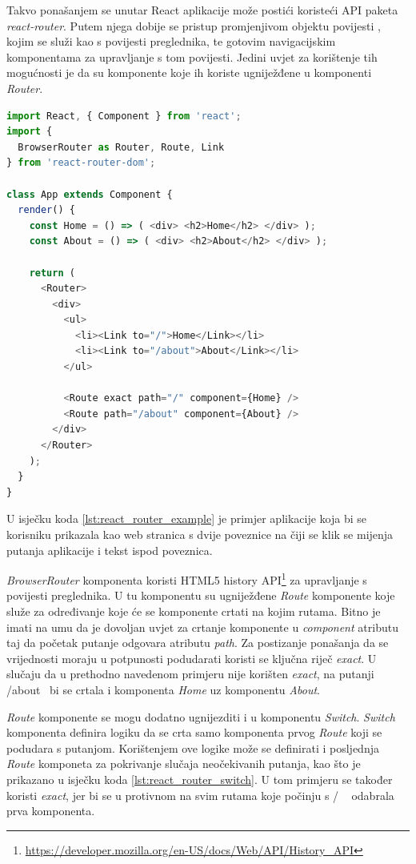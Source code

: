 \documentclass[times, utf8, zavrsni, numeric]{fer}
\newcommand{\razmakp}{\vspace{18pt}}
\newcommand{\razmaks}{\vspace{10pt}}
\begin{document}
Takvo ponašanjem se unutar React aplikacije može postići koristeći API paketa \emph{react-router}.
Putem njega dobije se pristup promjenjivom objektu povijesti , kojim se služi kao s povijesti preglednika, te gotovim navigacijskim komponentama za upravljanje s tom povijesti.
Jedini uvjet za korištenje tih mogućnosti je da su komponente koje ih koriste ugniježđene u komponenti \emph{Router}\citep{reactRouter}.

\razmakp
\begin{lstlisting}[language=JavaScript, caption={Primjer korištenja \emph{react-router}}, label={lst:react_router_example}]
import React, { Component } from 'react';
import { 
  BrowserRouter as Router, Route, Link
} from 'react-router-dom';

class App extends Component {
  render() {
    const Home = () => ( <div> <h2>Home</h2> </div> );
    const About = () => ( <div> <h2>About</h2> </div> );

    return (
      <Router>
        <div>
          <ul>
            <li><Link to="/">Home</Link></li>
            <li><Link to="/about">About</Link></li>
          </ul>

          <Route exact path="/" component={Home} />
          <Route path="/about" component={About} />
        </div>
      </Router>
    );
  }
}
\end{lstlisting}
\razmaks

U isječku koda \ref{lst:react_router_example} je primjer aplikacije koja bi se korisniku prikazala kao web stranica s dvije poveznice na čiji se klik se mijenja putanja aplikacije i tekst ispod poveznica.

\emph{BrowserRouter} komponenta koristi HTML5 history API\footnote{\url{https://developer.mozilla.org/en-US/docs/Web/API/History_API}} za upravljanje s povijesti preglednika.
U tu komponentu su ugniježđene \emph{Route} komponente koje služe za određivanje koje će se komponente crtati na kojim rutama.
Bitno je imati na umu da je dovoljan uvjet za crtanje komponente u \emph{component} atributu taj da početak putanje odgovara atributu \emph{path}.
Za postizanje ponašanja da se vrijednosti moraju u potpunosti podudarati koristi se ključna riječ \emph{exact}.
U slučaju da u prethodno navedenom primjeru nije korišten \emph{exact}, na putanji \glqq /about\grqq ~ bi se crtala i komponenta \emph{Home} uz komponentu \emph{About}.

\emph{Route} komponente se mogu dodatno ugnijezditi i u komponentu \emph{Switch}.
\emph{Switch} komponenta definira logiku da se crta samo komponenta prvog \emph{Route} koji se podudara s putanjom.
Korištenjem ove logike može se definirati i posljednja \emph{Route} komponeta za pokrivanje slučaja neočekivanih putanja, kao što je prikazano u isječku koda \ref{lst:react_router_switch}.
U tom primjeru se također koristi \emph{exact}, jer bi se u protivnom na svim rutama koje počinju s \glqq / \grqq ~ odabrala prva komponenta.
\end{document}
